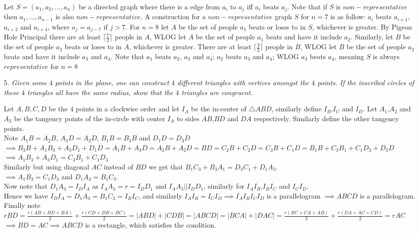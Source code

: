 \documentclass{article}
\begin{document}
\begin{enumerate}
Let $S = (a_1,a_2,...,a_n)$ be a directed graph where there is a edge from $a_i$ to $a_j$ iff $a_i$ beats $a_j$. Note that if $S$ is $non-representative$ then $a_1,...,a_{n-1}$ is also $non-representative$. A construction for a $non-representative$ graph $S$ for $n=7$ is as follow: $a_i$ beats $a_{i+1}$, $a_{i+2}$ and $a_{i+4}$, where $a_j = a_{j-7}$ if $j>7$. For $n=8$ let $A$ be the set of people $a_1$ beats or loses to in $S$, whichever is greater. By Pigeon Hole Principal there are at least $\lceil{\frac{7}{2}}\rceil$ people in $A$, WLOG let $A$ be the set of people $a_1$ beats and have it include $a_2$. Similarly, let $B$ be the set of people $a_2$ beats or loses to in $A$, whichever is greater. There are at least $\lceil{\frac{3}{2}}\rceil$ people in $B$, WLOG let $B$ be the set of people $a_2$ beats and have it include $a_3$ and $a_4$. Note that $a_1$ beats $a_2$, $a_3$ and $a_4$; $a_2$ beats $a_3$ and $a_4$; WLOG $a_3$ beats $a_4$, meaning $S$ is always $representative$ for $n=8$


\medskip
\item[5.] %
{\itshape Given some $4$ points in the plane, one can construct $4$ different triangles with vertices amongst the $4$ points.
If the inscribed circles of these $4$ triangles all have the same radius, show that the $4$ triangles are congruent. }

Let $A,B,C,D$ be the $4$ points in a clockwise order and let $I_A$ be the in-center of $\triangle ABD$, similarly define $I_B$,$I_C$ and $I_D$. Let $A_1$,$A_2$ and $A_3$ be the tangency points of the in-circle with center $I_A$ to sides $AB$,$BD$ and $DA$ respectively. Similarly define the other tangency points. 
\\Note $A_1B = A_2B$, $A_3D = A_2D$, $B_1B = B_3B$ and $D_1D = D_3D$
\\$\implies B_3B+A_1B_3+A_3D_1+D_1D = A_1B+A_3D = A_2B+A_2D = BD = C_2B+C_2D = C_3B+C_1D = B_1B+C_3B_1+C_1D_3+D_3D$
\\$\implies A_1B_3 + A_3D_1 = C_3B_1+C_1D_3$
\\Similarly but using diagonal $AC$ instead of $BD$ we get that $B_1C_3 + B_3A_1  = D_3C_1 + D_1A_3$.
\\$\implies A_1B_3 = C_1D_3$ and $D_1A_3 = B_1C_3$. 
\\Now note that $D_1A_3 = I_DI_A$ as $I_AA_3 = r = I_DD_1$ and $I_AA_3||I_DD_1$, similarly for $I_AI_B$,$I_BI_C$ and $I_CI_D$.
\\Hence we have $I_DI_A=D_1A_3=B_1C_3=I_BI_C$, and similarly $I_AI_B=I_CI_D \implies I_AI_BI_CI_D$ is a parallelogram $\implies ABCD$ is a parallelogram. 
\\Finally note $rBD = \frac{r(AB+BD+BA)}{2} + \frac{r(CD+DB+BC)}{2} = |ABD|+|CDB| = |ABCD| = |BCA|+|DAC| = \frac{r(BC+CA+AB)}{2} + \frac{r(DA+AC+CD)}{2} = rAC$
\\$\implies BD=AC \implies ABCD$ is a rectangle, which satisfies the condition.



\end{enumerate}
\end{document}
